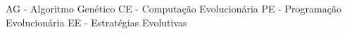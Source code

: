 \documentclass[a4paper,12pt,openright,oneside]{book}
\begin{document}
\listatabelas
 
\listasiglas
	{%
		AG - Algoritmo Genético
		CE - Computação Evolucionária
		PE - Programação Evolucionária
		EE - Estratégias Evolutivas
	}

\sumario

\newpage


\end{document}
